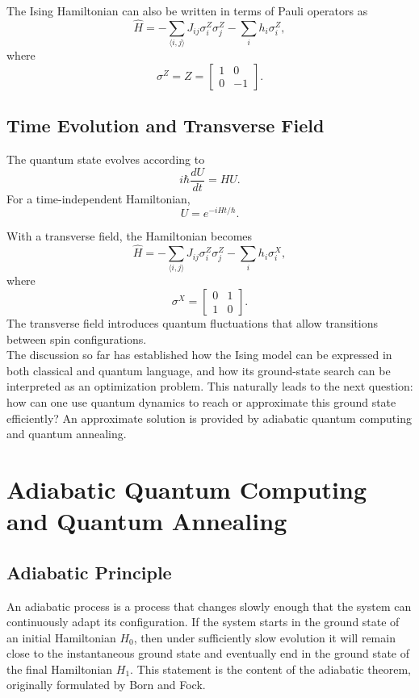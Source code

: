\documentclass[english,12pt,a4paper]{report}
\begin{document}
	The Ising Hamiltonian can also be written in terms of Pauli operators as
	\[
	\hat{H}=-\sum_{\langle i,j \rangle}J_{ij}\sigma_i^{Z}\sigma_j^{Z} -\sum_i h_i\sigma_i^Z,
	\]
	where
	\[
	\sigma^Z = Z =
	\begin{bmatrix}
		1&0\\
		0&-1
	\end{bmatrix}.
	\]
	\section{Time Evolution and Transverse Field}
	\hspace{1.15em}The quantum state evolves according to
	\[
	i\hbar\frac{dU}{dt}=HU.
	\]
	For a time-independent Hamiltonian,
	\[
	U=e^{-iHt/\hbar}.
	\]
	
	With a transverse field, the Hamiltonian becomes
	\[
	\hat{H}=-\sum_{\langle i,j\rangle}J_{ij}\sigma_i^Z\sigma_j^Z-\sum_i h_i\sigma_i^X,
	\]
	where
	\[
	\sigma^X=
	\begin{bmatrix}
		0&1\\
		1&0
	\end{bmatrix}.
	\]
	The transverse field introduces quantum fluctuations that allow transitions between spin configurations.
	\\
	The discussion so far has established how the Ising model can be expressed in both classical and quantum language, and how its ground-state search can be interpreted as an optimization problem. This naturally leads to the next question: how can one use quantum dynamics to reach or approximate this ground state efficiently? An approximate solution is provided by adiabatic quantum computing and quantum annealing.
	
	\chapter{Adiabatic Quantum Computing and Quantum Annealing}
	\section{Adiabatic Principle}
	\hspace{1.15em}An adiabatic process is a process that changes slowly enough that the system can continuously adapt its configuration. If the system starts in the ground state of an initial Hamiltonian $H_0$, then under sufficiently slow evolution it will remain close to the instantaneous ground state and eventually end in the ground state of the final Hamiltonian $H_1$. This statement is the content of the adiabatic theorem, originally formulated by Born and Fock.
	
\end{document}
